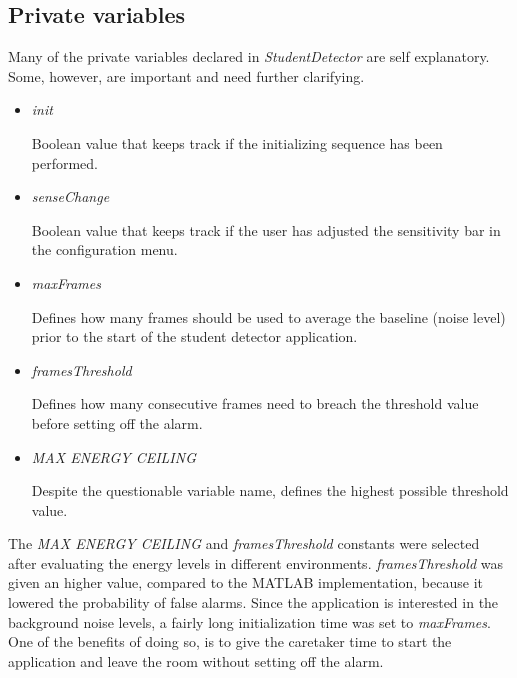 \subsection{Private variables}
Many of the private variables declared in \emph{StudentDetector} are self
explanatory. Some, however, are important and need further clarifying.

\begin{itemize}
\item \emph{init}
	
	Boolean value that keeps track if the initializing sequence has been
	performed.
\item \emph{senseChange}

	Boolean value that keeps track if the user has adjusted the sensitivity
	bar in the configuration menu.
\item \emph{maxFrames}

	Defines how many frames should be used to average the baseline (noise
	level) prior to the start of the student detector application.
\item \emph{framesThreshold}

	Defines how many consecutive frames need to breach the threshold value
	before setting off the alarm.
\item \emph{MAX ENERGY CEILING}
	
	Despite the questionable variable name, defines the highest
	possible threshold value.
\end{itemize}

The \emph{MAX ENERGY CEILING} and \emph{framesThreshold} constants were selected
after evaluating the energy levels in different environments.
\emph{framesThreshold} was given an higher value, compared to the MATLAB
implementation, because it lowered the probability of false alarms. Since the
application is interested in the background noise levels, a fairly long
initialization time was set to \emph{maxFrames}. One of the benefits of doing
so, is to give the caretaker time to start the application and leave the room 
without setting off the alarm.

